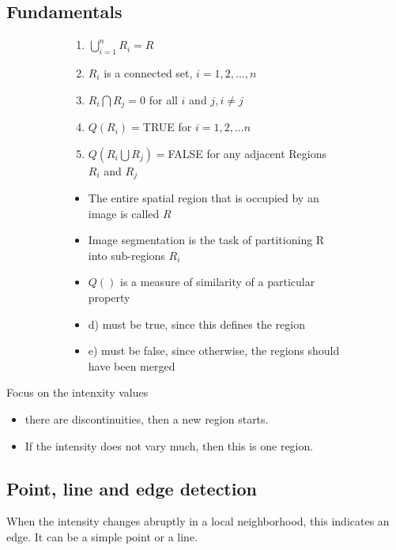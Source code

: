 \subsection{Fundamentals}
\begin{figure}[!h]
\begin{subfigure}[b]{0.48\textwidth}
\begin{enumerate}[label={\alph*)}]
\item $\bigcup\limits_{i=1}^{n}R_i=R$
\item $R_i$ is a connected set, $i=1,2,...,n$
\item $R_i\bigcap R_j = 0$ for all $i$ and $j, i\neq j$
\item $Q(R_i)=$TRUE for $i=1,2,...n$
\item $Q(R_i\bigcup R_j)=$FALSE for any adjacent Regions $R_i$ and $R_j$
\end{enumerate}
\end{subfigure}
\begin{subfigure}[b]{0.48\textwidth}
\begin{itemize}
\item The entire spatial region that is occupied by an image is called $R$
\item Image segmentation is the task of partitioning R into sub-regions $R_i$
\item $Q()$ is a measure of similarity of a particular property
\item d) must be true, since this defines the region
\item e) must be false, since otherwise, the regions should have been merged
\end{itemize}
\end{subfigure}
\end{figure}

Focus on the intenxity values
\begin{itemize}
\item there are discontinuities, then a new region starts.
\item If the intensity does not vary much, then this is one region.
\end{itemize}

\subsection{Point, line and edge detection}

When the intensity changes abruptly in a local neighborhood, this indicates an edge. It can be a simple point or a line.

